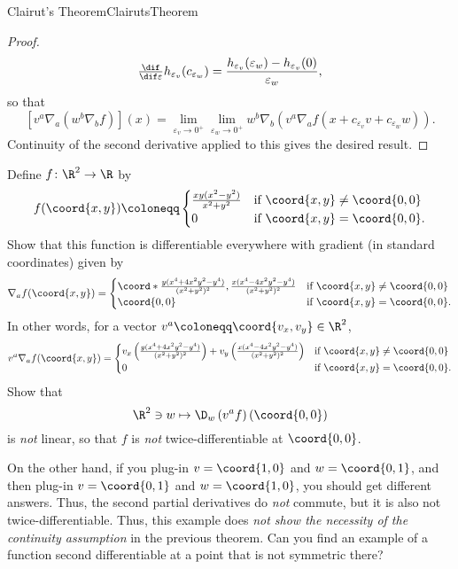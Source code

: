 \begin{thm}{Clairut's Theorem}{ClairutsTheorem}
\begin{proof}
\begin{equation}
\tfrac{\dif}{\dif \varepsilon}h_{\varepsilon _v}(c_{\varepsilon _w})=\frac{h_{\varepsilon _v}(\varepsilon _w)-h_{\varepsilon _v}(0)}{\varepsilon _w}, 
\end{equation}
so that
\begin{equation}
\left[ v^a\nabla _a(w^b\nabla _bf)\right] (x)=\lim _{\varepsilon _v\to 0^+}\lim _{\varepsilon _w\to 0^+}w^b\nabla _b\left( v^a\nabla _af(x+c_{\varepsilon _v}v+c_{\varepsilon _w}w)\right) .
\end{equation}
Continuity of the second derivative applied to this gives the desired result.
\end{proof}
\end{thm}
\begin{exr}{}{}
Define $f\colon \R ^2\rightarrow \R$ by
\begin{equation}
f(\coord{x,y})\coloneqq \begin{cases}\frac{xy(x^2-y^2)}{x^2+y^2} & \text{if }\coord{x,y}\neq \coord{0,0} \\ 0 & \text{if }\coord{x,y}=\coord{0,0}.\end{cases}
\end{equation}
Show that this function is differentiable everywhere with gradient (in standard coordinates) given by
{\small
\begin{equation}
\nabla _af(\coord{x,y})=\begin{cases}\coord*{\frac{y(x^4+4x^2y^2-y^4)}{(x^2+y^2)^2},\frac{x(x^4-4x^2y^2-y^4)}{(x^2+y^2)^2}} & \text{if }\coord{x,y}\neq \coord{0,0} \\ \coord{0,0} & \text{if }\coord{x,y}=\coord{0,0}.\end{cases}
\end{equation}
}
In other words, for a vector $v^a\coloneqq \coord{v_x,v_y}\in \R ^2$,
{\scriptsize
\begin{equation}
v^a\nabla _af(\coord{x,y})=\begin{cases}v_x\left(\frac{y(x^4+4x^2y^2-y^4)}{(x^2+y^2)^2} \right) +v_y\left( \frac{x(x^4-4x^2y^2-y^4)}{(x^2+y^2)^2}\right) & \text{if }\coord{x,y}\neq \coord{0,0} \\ 0 & \text{if }\coord{x,y}=\coord{0,0}.\end{cases}
\end{equation}
}
Show that
\begin{equation}
\R ^2\ni w\mapsto \D _w\left( v^af\right) (\coord{0,0})
\end{equation}
is \emph{not} linear, so that $f$ is \emph{not} twice-differentiable at $\coord{0,0}$.
\begin{rmk}
On the other hand, if you plug-in $v=\coord{1,0}$ and $w=\coord{0,1}$, and then plug-in $v=\coord{0,1}$ and $w=\coord{1,0}$, you should get different answers.  Thus, the second partial derivatives do \emph{not} commute, but it is also not twice-differentiable.  Thus, this example does \emph{not show the necessity of the continuity assumption} in the previous theorem.  Can you find an example of a function second differentiable at a point that is not symmetric there?
\end{rmk}
\end{exr}

